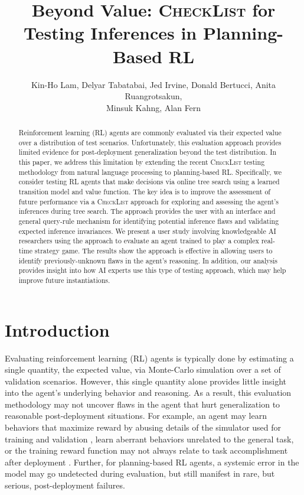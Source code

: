 \documentclass[letterpaper]{article} %
\title{Beyond Value: \textsc{CheckList} for Testing Inferences in Planning-Based RL}
\author {
    Kin-Ho Lam, %
     Delyar Tabatabai, %
     Jed Irvine,
     Donald Bertucci,
     Anita Ruangrotsakun,\\
     Minsuk Kahng,
     Alan Fern
}
\begin{document}
\maketitle


\begin{abstract}
Reinforcement learning (RL) agents are commonly evaluated via their expected value over a distribution of test scenarios.
Unfortunately, this evaluation approach provides limited evidence for post-deployment generalization beyond the test distribution. In this paper, we address this limitation by extending the recent \textsc{CheckList} testing methodology from natural language processing to planning-based RL. Specifically, we consider testing RL agents that make decisions via online tree search using a learned transition model and value function. The key idea is to improve the assessment of future performance via a \textsc{CheckList} approach for exploring and assessing the agent's inferences during tree search. The approach provides the user with an interface and general query-rule mechanism for identifying potential inference flaws and validating expected inference invariances. We present a user study involving knowledgeable AI researchers using the approach to evaluate an agent trained to play a complex real-time strategy game. The results show the approach is effective in allowing users to identify previously-unknown flaws in the agent's reasoning. In addition, our analysis provides insight into how AI experts use this type of testing approach, which may help improve future instantiations.
\end{abstract}

\section{Introduction}

Evaluating reinforcement learning (RL) agents is typically done by estimating a single quantity, the expected value, via Monte-Carlo simulation over a set of validation scenarios. However, this single quantity alone provides little insight into the agent's underlying behavior and reasoning. As a result, this evaluation methodology may not uncover flaws in the agent that hurt generalization to reasonable post-deployment situations. For example, an agent may learn behaviors that maximize reward by abusing details of the simulator used for training and validation \cite{baker2020emergent}, learn aberrant behaviors unrelated to the general task, or the training reward function may not always relate to task accomplishment after deployment \cite{clark_2019,gleave2021adversarial}. Further, for planning-based RL agents, a systemic error in the model may go undetected during evaluation, but still manifest in rare, but serious, post-deployment failures. 
\end{document}
